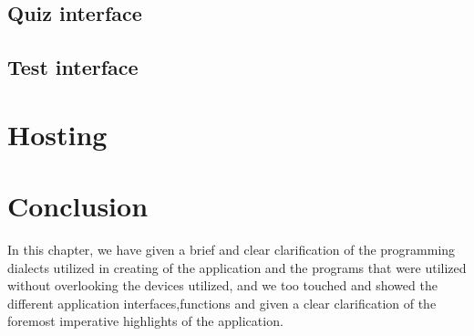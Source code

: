 \subsection{Quiz interface}

\subsection{Test interface}

\section{Hosting}

\section{Conclusion}
In this chapter, we have given a brief and clear clarification of the programming dialects utilized in creating of the application and the programs that were utilized without overlooking the devices utilized, and we too touched and showed the different application interfaces,functions and given a clear clarification of the foremost imperative highlights of the application.\\